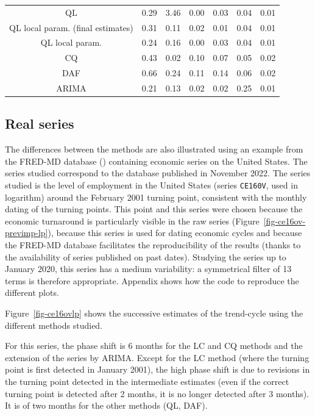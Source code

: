 \documentclass[
]{article}
\newcommand\1{\mathds{1}}
\begin{document}
\begin{table}
{\begin{tabular}{ccccccc}
\hspace{1em}QL & 0.29 & 3.46 & 0.00 & 0.03 & 0.04 & 0.01\\
\hspace{1em}QL local param. (final estimates) & 0.31 & 0.11 & 0.02 & 0.01 & 0.04 & 0.01\\
\hspace{1em}QL local param. & 0.24 & 0.16 & 0.00 & 0.03 & 0.04 & 0.01\\
\hspace{1em}CQ & 0.43 & 0.02 & 0.10 & 0.07 & 0.05 & 0.02\\
\hspace{1em}DAF & 0.66 & 0.24 & 0.11 & 0.14 & 0.06 & 0.02\\
\hspace{1em}ARIMA & 0.21 & 0.13 & 0.02 & 0.02 & 0.25 & 0.01\\
\bottomrule
\end{tabular}

}

\end{table}%

\subsection{Real series}\label{real-series}

The differences between the methods are also illustrated using an
example from the FRED-MD database (\textcite{fredmd}) containing
economic series on the United States. The series studied correspond to
the database published in November 2022. The series studied is the level
of employment in the United States (series \texttt{CE160V}, used in
logarithm) around the February 2001 turning point, consistent with the
monthly dating of the turning points. This point and this series were
chosen because the economic turnaround is particularly visible in the
raw series (Figure~\ref{fig-ce16ov-previmp-lp}), because this series is
used for dating economic cycles and because the FRED-MD database
facilitates the reproducibility of the results (thanks to the
availability of series published on past dates). Studying the series up
to January 2020, this series has a medium variability: a symmetrical
filter of 13 terms is therefore appropriate. Appendix
\autocite*{ann-ex-r} shows how the code to reproduce the different
plots.

Figure~\ref{fig-ce16ovlp} shows the successive estimates of the
trend-cycle using the different methods studied.

For this series, the phase shift is 6 months for the LC and CQ methods
and the extension of the series by ARIMA. Except for the LC method
(where the turning point is first detected in January 2001), the high
phase shift is due to revisions in the turning point detected in the
intermediate estimates (even if the correct turning point is detected
after 2 months, it is no longer detected after 3 months). It is of two
months for the other methods (QL, DAF).
\end{document}

